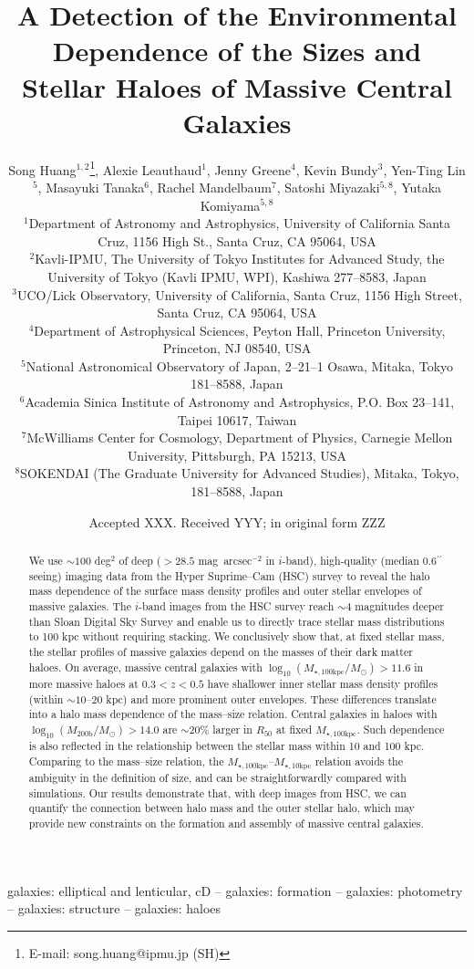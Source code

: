 \documentclass[a4paper,fleqn,usenatbib]{mnras}
\title[Structure and Environment of Massive Galaxies]{
       A Detection of the Environmental Dependence of the Sizes and Stellar Haloes
       of Massive Central Galaxies}
\author[S. Huang et al.]{
        Song Huang$^{1,2}$\thanks{E-mail: song.huang@ipmu.jp (SH)},
        Alexie Leauthaud$^{1}$,
        Jenny Greene$^{4}$,
        Kevin Bundy$^{3}$,
        \newauthor
        Yen-Ting Lin$^{5}$,
        Masayuki Tanaka$^{6}$,
        Rachel Mandelbaum$^{7}$,
        Satoshi Miyazaki$^{5,8}$,
        \newauthor
        Yutaka Komiyama$^{5,8}$
        \\
        $^{1}$Department of Astronomy and Astrophysics, University of California 
              Santa Cruz, 1156 High St., Santa Cruz, CA 95064, USA\\
        $^{2}$Kavli-IPMU, The University of Tokyo Institutes for Advanced Study, 
              the University of Tokyo (Kavli IPMU, WPI), Kashiwa 277--8583, Japan\\              
        $^{3}$UCO/Lick Observatory, University of California, Santa Cruz,
              1156 High Street, Santa Cruz, CA 95064, USA\\
        $^{4}$Department of Astrophysical Sciences, Peyton Hall,
              Princeton University, Princeton, NJ 08540, USA \\
        $^{5}$National Astronomical Observatory of Japan, 2--21--1 Osawa, Mitaka, 
              Tokyo 181--8588, Japan\\
        $^{6}$Academia Sinica Institute of Astronomy and Astrophysics, 
              P.O. Box 23--141, Taipei 10617, Taiwan\\
        $^{7}$McWilliams Center for Cosmology, Department of Physics, 
              Carnegie Mellon University, Pittsburgh, PA 15213, USA\\
        $^{8}$SOKENDAI (The Graduate University for Advanced Studies), Mitaka,
              Tokyo, 181--8588, Japan
        }
\date{Accepted XXX. Received YYY; in original form ZZZ}
\def\asec{$^{\prime\prime}$}
\def\sb{mag~arcsec$^{-2}$}
\def\logmh{{$\log_{10} (M_{\mathrm{200b}}/M_{\odot})$}}
\def\minn{{$M_{\star,10\mathrm{kpc}}$}}
\def\mtot{{$M_{\star,100\mathrm{kpc}}$}}
\def\logmtot{{$\log_{10} (M_{\star,100\mathrm{kpc}}/M_{\odot})$}}
\begin{document}
\label{firstpage}
\pagerange{\pageref{firstpage}--\pageref{lastpage}}

\maketitle


\begin{abstract}  We use ${\sim}100$ deg$^2$ of 
    deep ($>28.5$ \sb{} in $i$-band), high-quality 
    (median 0.6\asec seeing) imaging data from the Hyper Suprime--Cam (HSC) survey to reveal the halo mass dependence of the surface mass density profiles and outer stellar envelopes of massive galaxies. The $i$-band images from the HSC survey reach ${\sim}4$ magnitudes deeper than 
    Sloan Digital Sky Survey and enable us to directly trace stellar mass distributions 
    to 100 kpc without requiring stacking.  
    We conclusively show that, at fixed stellar mass, the stellar profiles of massive 
    galaxies depend on the masses of their dark matter haloes. 
    On average, massive central galaxies with \logmtot{}$>11.6$ in more massive haloes 
    at $0.3 < z < 0.5$ have shallower inner stellar mass density profiles 
    (within ${\sim}10$--$20$ kpc) and more prominent outer envelopes. 
    These differences translate into a halo mass dependence of the mass--size relation. Central galaxies in haloes with \logmh{}$>14.0$ are $\sim 20$\% larger in $R_{\mathrm{50}}$ at fixed \mtot{}. Such dependence is also reflected in the relationship between the stellar mass 
    within 10 and 100 kpc.  Comparing to the mass--size relation, the \mtot{}--\minn{} relation avoids the 
    ambiguity in the definition of size, and can be straightforwardly compared with 
    simulations. 
    Our results demonstrate that, with deep images from HSC, we can quantify the 
    connection between halo mass and the outer stellar halo, which may provide new 
    constraints on the formation and assembly of massive central galaxies.
    
\end{abstract}

\begin{keywords}
    galaxies: elliptical and lenticular, cD --
    galaxies: formation --
    galaxies: photometry -- 
    galaxies: structure -- 
    galaxies: haloes
\end{keywords}
\end{document}
